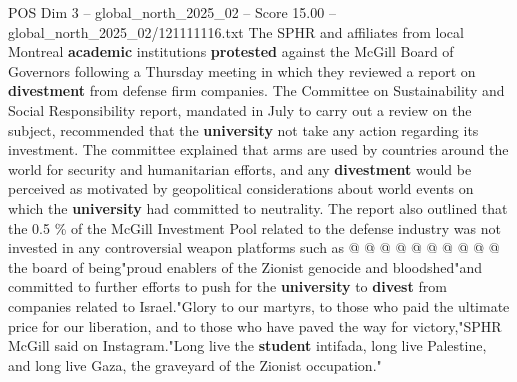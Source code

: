 \begin{textsample}{POS Dim 3 – global\_north\_2025\_02 – Score 15.00 – global\_north\_2025\_02/121111116.txt}
The SPHR and affiliates from local Montreal \textbf{academic} institutions \textbf{protested} against the McGill Board of Governors following a Thursday meeting in which they reviewed a report on \textbf{divestment} from defense firm companies.
The Committee on Sustainability and Social Responsibility report, mandated in July to carry out a review on the subject, recommended that the \textbf{university} not take any action regarding its investment.
The committee explained that arms are used by countries around the world for security and humanitarian efforts, and any \textbf{divestment} would be perceived as motivated by geopolitical considerations about world events on which the \textbf{university} had committed to neutrality.
The report also outlined that the 0.5 \% of the McGill Investment Pool related to the defense industry was not invested in any controversial weapon platforms such as @ @ @ @ @ @ @ @ @ @ the board of being"proud enablers of the Zionist genocide and bloodshed"and committed to further efforts to push for the \textbf{university} to \textbf{divest} from companies related to Israel."Glory to our martyrs, to those who paid the ultimate price for our liberation, and to those who have paved the way for victory,"SPHR McGill said on Instagram."Long live the \textbf{student} intifada, long live Palestine, and long live Gaza, the graveyard of the Zionist occupation."

\end{textsample}
